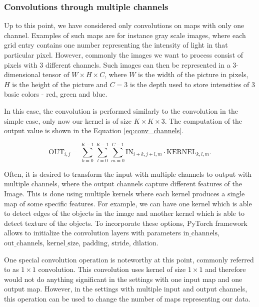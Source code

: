 \subsubsection{Convolutions through multiple channels}
Up to this point, we have considered only convolutions on maps with only one channel.
Examples of such maps are for instance gray scale images, where each grid entry contains one number representing the intensity of light in that particular pixel.
However, commonly the images we want to process consist of pixels with 3 different channels.
Such images can then be represented in a 3-dimensional tensor of $W \times H \times C$, where $W$ is the width of the picture in pixels, $H$ is the height of the picture and $C=3$ is the depth used to store intensities of 3 basic colors - red, green and blue. 

In this case, the convolution is performed similarly to the convolution in the simple case, only now our kernel is of size $K \times K \times 3$.
The computation of the output value is shown in the Equation \ref{eq:conv_channels}.

\begin{equation}
    \text{OUT}_{i,j} = \sum_{k=0}^{K-1} \sum_{l=0}^{K-1} \sum_{m=0}^{C-1} 
        \text{IN}_{i+k,j+l, m} \cdot \text{KERNEL}_{k, l, m}.
    \label{eq:conv_channels}
\end{equation}

Often, it is desired to transform the input with multiple channels to output with multiple channels, where the output channels capture different features of the Image.
This is done using multiple kernels where each kernel produces a single map of some specific features.
For example, we can have one kernel which is able to detect edges of the objects in the image and another kernel which is able to detect texture of the objects.
To incorporate these options, PyTorch framework allows to initialize the convolution layers with parameters $\text{in\_channels}$, $\text{out\_channels}$, $\text{kernel\_size}$, $\text{padding}$, $\text{stride}$, $\text{dilation}$.

One special convolution operation is noteworthy at this point, commonly referred to as $1 \times 1$ convolution.
This convolution uses kernel of size $1 \times 1$ and therefore would not do anything significant in the settings with one input map and one output map.
However, in the settings with multiple input and output channels, this operation can be used to change the number of maps representing our data.

